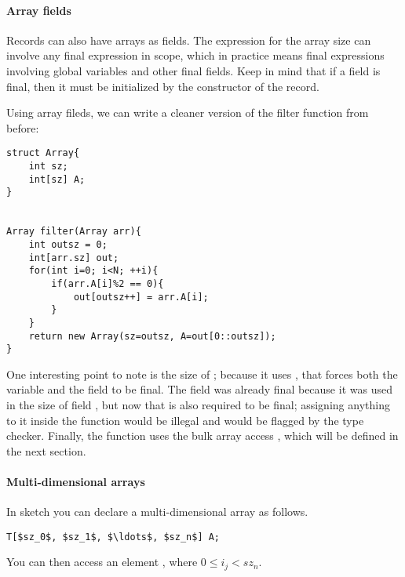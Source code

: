 \paragraph{Array fields}
Records can also have arrays as fields. The expression for the array size can involve any final expression in scope, which in practice means final expressions involving global variables and other final fields. Keep in mind that if a field is final, then it must be initialized by the constructor of the record. 

\begin{Example}
Using array fileds, we can write a cleaner version of the filter function from before:
\begin{lstlisting}
struct Array{
	int sz;
	int[sz] A;
}


Array filter(Array arr){
	int outsz = 0;
	int[arr.sz] out;
	for(int i=0; i<N; ++i){
		if(arr.A[i]%2 == 0){
			out[outsz++] = arr.A[i];
		}
	}
	return new Array(sz=outsz, A=out[0::outsz]);
}
\end{lstlisting}
One interesting point to note is the size of ; because it uses , that forces both the variable  and the field  to be final. The field  was already final because it was used in the size of field , but now that  is also required to be final; assigning anything to it inside the function would be illegal and would be flagged by the type checker. Finally, the function uses the bulk array access , which will be defined in the next section.
\end{Example}






\paragraph{Multi-dimensional arrays}
In sketch you can declare a multi-dimensional array as follows.
\begin{lstlisting}
T[$sz_0$, $sz_1$, $\ldots$, $sz_n$] A;
\end{lstlisting}
You can then access an element , where $0\leq i_j < sz_n$. 

